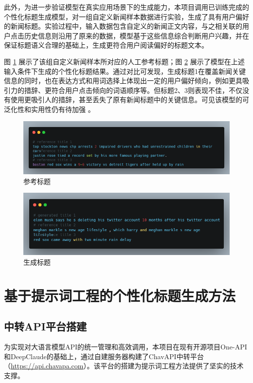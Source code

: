 \documentclass[10pt,a4paper]{article}
\begin{document}
此外，为进一步验证模型在真实应用场景下的生成能力，本项目调用已训练完成的个性化标题生成模型，对一组自定义新闻样本数据进行实验，生成了具有用户偏好的新闻标题。实验过程中，输入数据包含自定义的新闻正文内容，与之相关联的用户点击历史信息则沿用了原来的数据，模型基于这些信息综合判断用户兴趣，并在保证标题语义合理的基础上，生成更符合用户阅读偏好的标题文本。

图 \ref{fig:ref} 展示了该组自定义新闻样本所对应的人工参考标题；图 \ref{fig:gen} 展示了模型在上述输入条件下生成的个性化标题结果。通过对比可发现，生成标题1在覆盖新闻关键信息的同时，也在表达方式和用词选择上体现出一定的用户偏好倾向，例如更具吸引力的措辞、更符合用户点击倾向的词语顺序等。但标题2、3则表现不佳，不仅没有使用更吸引人的措辞，甚至丢失了原有新闻标题中的关键信息。可见该模型的可泛化性和实用性仍有待加强
。
\begin{figure}[H]
  \centering
  \includegraphics[width=15cm]{fig/reference.png}
  \caption{参考标题}\label{fig:ref}
\end{figure}
\begin{figure}[H]
  \centering
  \includegraphics[width=15cm]{fig/generated.png}
  \caption{生成标题}\label{fig:gen}
\end{figure}


\section{基于提示词工程的个性化标题生成方法}
\subsection{中转API平台搭建}
为实现对大语言模型API的统一管理和高效调用，本项目在现有开源项目One-API和DeepClaude的基础上，通过自建服务器构建了ChavAPI中转平台（\url{https://api.chavapa.com}）。该平台的搭建为提示词工程方法提供了坚实的技术支撑。
\end{document}
